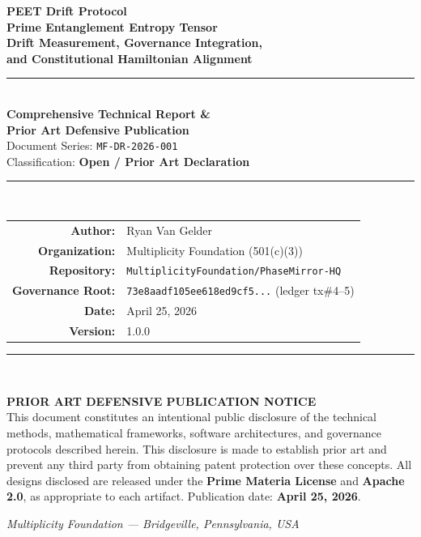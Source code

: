 \documentclass[11pt,letterpaper]{article}
\theoremstyle{definition}
\theoremstyle{remark}
\begin{document}
\begin{titlepage}
\centering
\vspace*{1.5cm}

{\LARGE\bfseries PEET Drift Protocol}\\[0.4em]
{\large\bfseries Prime Entanglement Entropy Tensor\\
Drift Measurement, Governance Integration,\\
and Constitutional Hamiltonian Alignment}\\[1.2em]

\rule{0.6\textwidth}{0.8pt}\\[0.8em]

{\large \textbf{Comprehensive Technical Report \&\\
Prior Art Defensive Publication}}\\[0.6em]

{\normalsize Document Series: \texttt{MF-DR-2026-001}}\\
{\normalsize Classification: \textbf{Open / Prior Art Declaration}}\\[0.4em]

\rule{0.6\textwidth}{0.4pt}\\[1em]

\begin{tabular}{rl}
\textbf{Author:}          & Ryan Van Gelder \\
\textbf{Organization:}    & Multiplicity Foundation (501(c)(3)) \\
\textbf{Repository:}      & \texttt{MultiplicityFoundation/PhaseMirror-HQ} \\
\textbf{Governance Root:} & \texttt{73e8aadf105ee618ed9cf5...} (ledger tx\#4--5) \\
\textbf{Date:}            & April 25, 2026 \\
\textbf{Version:}         & 1.0.0 \\
\end{tabular}

\vspace{1.2em}
\rule{0.6\textwidth}{0.4pt}\\[1em]

\begin{defensivebox}
\textbf{PRIOR ART DEFENSIVE PUBLICATION NOTICE}\\[0.4em]
This document constitutes an intentional public disclosure of the
technical methods, mathematical frameworks, software architectures,
and governance protocols described herein. This disclosure is made
to establish prior art and prevent any third party from obtaining
patent protection over these concepts. All designs disclosed are
released under the \textbf{Prime Materia License} and \textbf{Apache 2.0},
as appropriate to each artifact. Publication date: \textbf{April 25, 2026}.
\end{defensivebox}

\vfill
{\small\textit{Multiplicity Foundation --- Bridgeville, Pennsylvania, USA}}
\end{titlepage}
\end{document}
